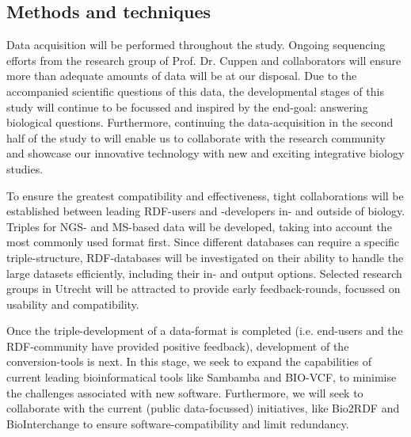 \documentclass[twoside,fontsize=10pt]{article}
\begin{document}
\subsection*{Methods and techniques} %
Data acquisition will be performed throughout the study. Ongoing sequencing efforts from the research group of Prof. Dr. Cuppen and collaborators will ensure more than adequate amounts of data will be at our disposal. Due to the accompanied scientific questions of this data, the developmental stages of this study will continue to be focussed and inspired by the end-goal: answering biological questions. Furthermore, continuing the data-acquisition in the second half of the study to will enable us to collaborate with the research community and showcase our innovative technology with new and exciting integrative biology studies.
\medskip

\noindent
To ensure the greatest compatibility and effectiveness, tight collaborations will be established between leading RDF-users and -developers in- and outside of biology. Triples for NGS- and MS-based data will be developed, taking into account the most commonly used format first. Since different databases can require a specific triple-structure, RDF-databases will be investigated on their ability to handle the large datasets efficiently, including their in- and output options. Selected research groups in Utrecht will be attracted to provide early feedback-rounds, focussed on usability and compatibility. 

Once the triple-development of a data-format is completed (i.e. end-users and the RDF-community have provided positive feedback), development of the conversion-tools is next. In this stage, we seek to expand the capabilities of current leading bioinformatical tools like Sambamba\cite{Tarasov2014} and BIO-VCF\cite{Goto2010}, to minimise the challenges associated with new software. Furthermore, we will seek to collaborate with the current (public data-focussed) initiatives, like Bio2RDF\cite{Belleau2008} and BioInterchange\cite{Baran} to ensure software-compatibility and limit redundancy.
\medskip
\end{document}

